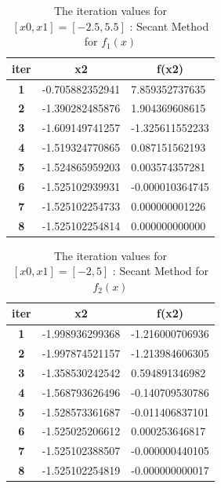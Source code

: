 \documentclass[a4paper, 12pt]{report}
\begin{document}
\begin{table}[h]
\centering
\begin{tabular}{|c|l|l|}
\hline
\textbf{iter} & \multicolumn{1}{c|}{\textbf{x2}} & \multicolumn{1}{c|}{\textbf{f(x2)}} \\ \hline
\textbf{1} & -0.705882352941 & 7.859352737635  \\ \hline
\textbf{2} & -1.390282485876 & 1.904369608615  \\ \hline
\textbf{3} & -1.609149741257 & -1.325611552233 \\ \hline
\textbf{4} & -1.519324770865 & 0.087151562193  \\ \hline
\textbf{5} & -1.524865959203 & 0.003574357281  \\ \hline
\textbf{6} & -1.525102939931 & -0.000010364745 \\ \hline
\textbf{7} & -1.525102254733 & 0.000000001226  \\ \hline
\textbf{8} & -1.525102254814 & 0.000000000000  \\ \hline
\end{tabular}
\caption{The iteration values for $[x0,x1] = [-2.5,5.5]$ : Secant Method for $f_{1}(x)$}
\label{table:10}
\end{table}

\begin{table}[h]
\centering
\begin{tabular}{|c|l|l|}
\hline
\textbf{iter} & \multicolumn{1}{c|}{\textbf{x2}} & \multicolumn{1}{c|}{\textbf{f(x2)}} \\ \hline
\textbf{1} & -1.998936299368 & -1.216000706936 \\ \hline
\textbf{2} & -1.997874521157 & -1.213984606305 \\ \hline
\textbf{3} & -1.358530242542 & 0.594891346982  \\ \hline
\textbf{4} & -1.568793626496 & -0.140709530786 \\ \hline
\textbf{5} & -1.528573361687 & -0.011406837101 \\ \hline
\textbf{6} & -1.525025206612 & 0.000253646817  \\ \hline
\textbf{7} & -1.525102388507 & -0.000000440105 \\ \hline
\textbf{8} & -1.525102254819 & -0.000000000017 \\ \hline
\end{tabular}
\caption{The iteration values for $[x0,x1] = [-2,5]$ : Secant Method for $f_{2}(x)$}
\label{table:11}
\end{table}
\end{document}
